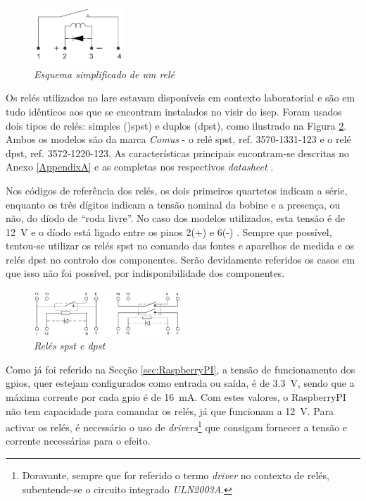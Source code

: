 \begin{figure}[hbtp]
    \centering
    \includegraphics[width=0.3\textwidth]{figures/esquematico_rele.png}
    \caption{\textit{Esquema simplificado de um relé \cite{DryRelay}}}
    \label{fig:esquematicoreles}
\end{figure}

Os relés utilizados no \acrshort{lare} estavam disponíveis em contexto laboratorial e são em tudo idênticos aos que se encontram instalados no \acrshort{visir}  do \acrshort{isep}. Foram usados dois tipos de relés: simples ()\acrfull{spst}) e duplos (\acrfull{dpst}), como ilustrado na Figura \ref {fig:reles}. Ambos os modelos são da marca \textit{Comus} - o relé \acrshort{spst}, ref. 3570-1331-123 e o relé \acrshort{dpst}, ref. 3572-1220-123. As características principais encontram-se descritas no Anexo \ref{AppendixA} e as completas nos respectivos \textit{datasheet} \cite{DryRelay}. 

Nos códigos de referência dos relés, os dois primeiros quartetos indicam a série, enquanto os três dígitos indicam a tensão nominal da bobine e a presença, ou não, do díodo de ``roda livre''. No caso dos modelos utilizados, esta tensão é de \SI{12}{\volt} e o díodo está ligado entre os pinos 2(+) e 6(-) \cite{DryRelay}. Sempre que possível, tentou-se utilizar os relés \acrshort{spst} no comando das fontes e aparelhos de medida e os relés \acrshort{dpst} no controlo dos componentes. Serão devidamente referidos os casos em que isso não foi possível, por indisponibilidade dos componentes.

\begin{figure}[hbtp]
    \centering
    \includegraphics[width=0.5\textwidth]{figures/reles.png}
    \caption{\textit{Relés \acrshort{spst} e \acrshort{dpst}} \cite{DryRelay}}
    \label{fig:reles}
\end{figure}

Como já foi referido na Secção \ref{sec:RaspberryPI}, a tensão de funcionamento dos \acrshort{gpio}s, quer estejam configurados como entrada ou saída, é de \SI{3.3}{\volt}, sendo que a máxima corrente por cada \acrshort{gpio} é de \SI{16}{\mA}.
Com estes valores, o \gls{RaspberryPI} não tem capacidade para comandar os relés, já que funcionam a \SI{12}{\volt}. Para activar os relés, é necessário o uso de \textit{drivers}\footnote{Doravante, sempre que for referido o termo \textit{driver} no contexto de relés, subentende-se o circuito integrado \textit{ULN2003A}.} que consigam fornecer a tensão e corrente necessárias para o efeito.

